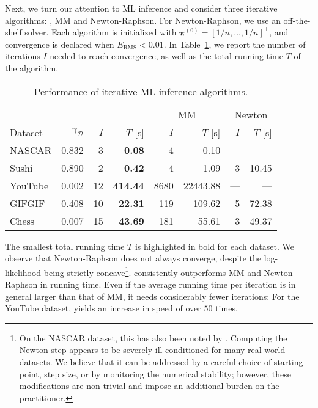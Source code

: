 Next, we turn our attention to ML inference and consider three iterative algorithms: \ILSR{}, MM and Newton-Raphson.
For Newton-Raphson, we use an off-the-shelf solver.
Each algorithm is initialized with $\bm{\pi}^{(0)} = [1/n, \ldots, 1/n]^\intercal$, and convergence is declared when $E_{\text{RMS}} < 0.01$.
In Table~\ref{fi:tab:mlalg}, we report the number of iterations $I$ needed to reach convergence, as well as the total running time $T$ of the algorithm.

\begin{table}[ht]
  \vspace{-0.3cm}
  \caption{Performance of iterative ML inference algorithms.}
  \label{fi:tab:mlalg}
  \centering
  \small{
  \begin{tabular}{l r rr rr rr}
    \toprule
             &             & \multicolumn{2}{c}{\ILSR{}}        & \multicolumn{2}{c}{MM}      & \multicolumn{2}{c}{Newton} \\
                             \cmidrule(l){3-4}                  \cmidrule(l){5-6}             \cmidrule(l){7-8}
    Dataset  & $\gamma_{\mathcal{D}}$ & $I$ &         $T$ [s] &        $I$ &        $T$ [s] &     $I$ &     $T$ [s] \\
    \midrule
    NASCAR   & \num{0.832} &  \num{3} &   \bfseries\num{0.08} &    \num{4} &     \num{0.10} &     --- &         --- \\
    Sushi    & \num{0.890} &  \num{2} &   \bfseries\num{0.42} &    \num{4} &     \num{1.09} & \num{3} & \num{10.45} \\
    \addlinespace
    YouTube  & \num{0.002} & \num{12} & \bfseries\num{414.44} & \num{8680} & \num{22443.88} &     --- &         --- \\
    GIFGIF   & \num{0.408} & \num{10} &  \bfseries\num{22.31} &  \num{119} &   \num{109.62} & \num{5} & \num{72.38} \\
    \addlinespace
    Chess    & \num{0.007} & \num{15} &  \bfseries\num{43.69} &  \num{181} &    \num{55.61} & \num{3} & \num{49.37} \\
    \bottomrule
  \end{tabular}
  }
\end{table}

The smallest total running time $T$ is highlighted in bold for each dataset.
We observe that Newton-Raphson does not always converge, despite the log-likelihood being strictly concave\footnote{
On the NASCAR dataset, this has also been noted by \citet{hunter2004mm}.
Computing the Newton step appears to be severely ill-conditioned for many real-world datasets.
We believe that it can be addressed by a careful choice of starting point, step size, or by monitoring the numerical stability;
however, these modifications are non-trivial and impose an additional burden on the practitioner.
}.
\ILSR{} consistently outperforms MM and Newton-Raphson in running time.
Even if the average running time per iteration is in general larger than that of MM, it needs considerably fewer iterations:
For the YouTube dataset, \ILSR{} yields an increase in speed of over $50$ times.

